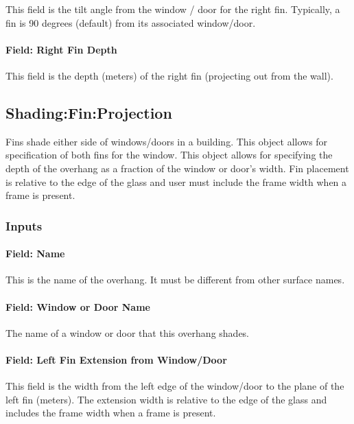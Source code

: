 This field is the tilt angle from the window / door for the right fin. Typically, a fin is 90 degrees (default) from its associated window/door.

\paragraph{Field: Right Fin Depth}\label{field-right-fin-depth}

This field is the depth (meters) of the right fin (projecting out from the wall).

\subsection{Shading:Fin:Projection}\label{shadingfinprojection}

Fins shade either side of windows/doors in a building. This object allows for specification of both fins for the window. This object allows for specifying the depth of the overhang as a fraction of the window or door's width. Fin placement is relative to the edge of the glass and user must include the frame width when a frame is present.

\subsubsection{Inputs}\label{inputs-29-002}

\paragraph{Field: Name}\label{field-name-27-003}

This is the name of the overhang. It must be different from other surface names.

\paragraph{Field: Window or Door Name}\label{field-window-or-door-name-3}

The name of a window or door that this overhang shades.

\paragraph{Field: Left Fin Extension from Window/Door}\label{field-left-fin-extension-from-windowdoor-1}

This field is the width from the left edge of the window/door to the plane of the left fin (meters). The extension width is relative to the edge of the glass and includes the frame width when a frame is present.

